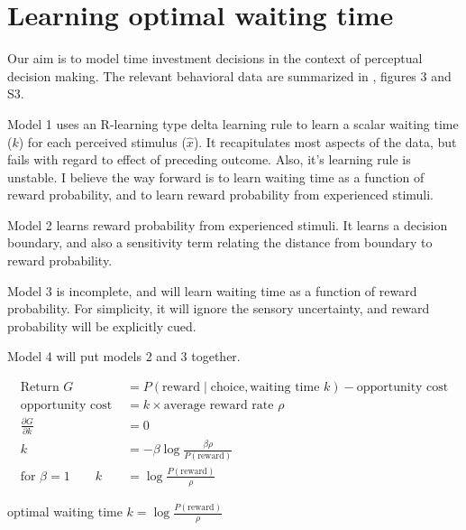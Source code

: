 \section{Learning optimal waiting time}

Our aim is to model time investment decisions in the context of perceptual decision making.
The relevant behavioral data are summarized in \cite{lak2014orbitofrontal}, figures 3 and S3.

Model 1 uses an R-learning type delta learning rule to learn a scalar waiting time ($k$) for each perceived stimulus ($\hat{x}$).
It recapitulates most aspects of the data, but fails with regard to effect of preceding outcome.
Also, it's learning rule is unstable.
I believe the way forward is to learn waiting time as a function of reward probability, and to learn reward probability from experienced stimuli.

Model 2 learns reward probability from experienced stimuli.
It learns a decision boundary, and also a sensitivity term relating the distance from boundary to reward probability.

Model 3 is incomplete, and will learn waiting time as a function of reward probability.
For simplicity, it will ignore the sensory uncertainty, and reward probability will be explicitly cued.

Model 4 will put models 2 and 3 together.






 


\clearpage
\begin{align}
\text{Return } G &= P(\text{reward} \mid \text{choice} , \text{waiting time } k) - \text{opportunity cost} \nonumber
\\
\text{opportunity cost } &=  k \times   \text{average reward rate } \rho \nonumber
\\
\frac{\partial G}{\partial k} \nonumber &= 0 \\
k &= -\beta \log \frac{\beta \rho}{P(\text{reward})} \nonumber \\
\text{for } \beta = 1 \qquad k &= \log \frac{P(\text{reward})}{\rho} \nonumber
\end{align}

\clearpage

optimal waiting time $k = \log \frac{P(\text{reward})}{\rho} $